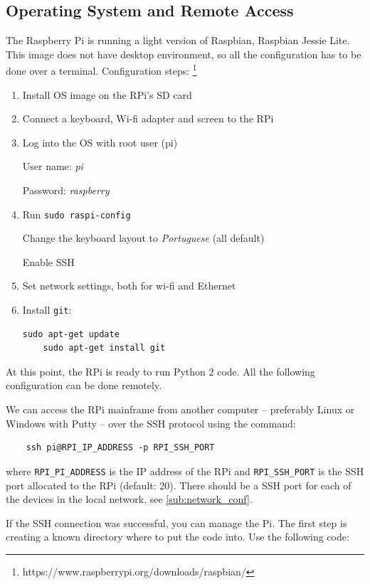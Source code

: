 \documentclass[twoside,a4paper]{refart}
\begin{document}
\subsection{Operating System and Remote Access}
The Raspberry Pi is running a light version of Raspbian, Raspbian Jessie Lite\footnotemark. This image does not have desktop environment, so all the configuration has to be done over a terminal. Configuration steps:
\footnote{https://www.raspberrypi.org/downloads/raspbian/}
\begin{enumerate}
	\item Install OS image on the RPi's SD card
	\item Connect a keyboard, Wi-fi adapter and screen to the RPi
	\item Log into the OS with root user (pi)
	
	User name: \emph{pi}
	
	Password: \emph{raspberry}
	\item Run {\tt sudo raspi-config}
	
	Change the keyboard layout to \emph{Portuguese} (all default) 
	
	Enable SSH
	\item Set network settings, both for wi-fi and Ethernet
	\item Install {\tt git}:
	
	\begin{verbatim}sudo apt-get update
	sudo apt-get install git
	\end{verbatim}
	
\end{enumerate}
At this point, the RPi is ready to run Python 2 code. All the following configuration can be done remotely.

We can access the RPi mainframe from another computer -- preferably Linux or Windows with Putty -- over the SSH protocol using the command:

\begin{verbatim}
	ssh pi@RPI_IP_ADDRESS -p RPI_SSH_PORT
\end{verbatim}
where {\tt RPI\_PI\_ADDRESS} is the IP address of the RPi and {\tt RPI\_SSH\_PORT} is the SSH port allocated to the RPi (default: 20). There should be a SSH port for each of the devices in the local network, see \cref{sub:network_conf}.

If the SSH connection was successful, you can manage the Pi. The first step is creating a known directory where to put the code into. Use the following code:
\end{document}
